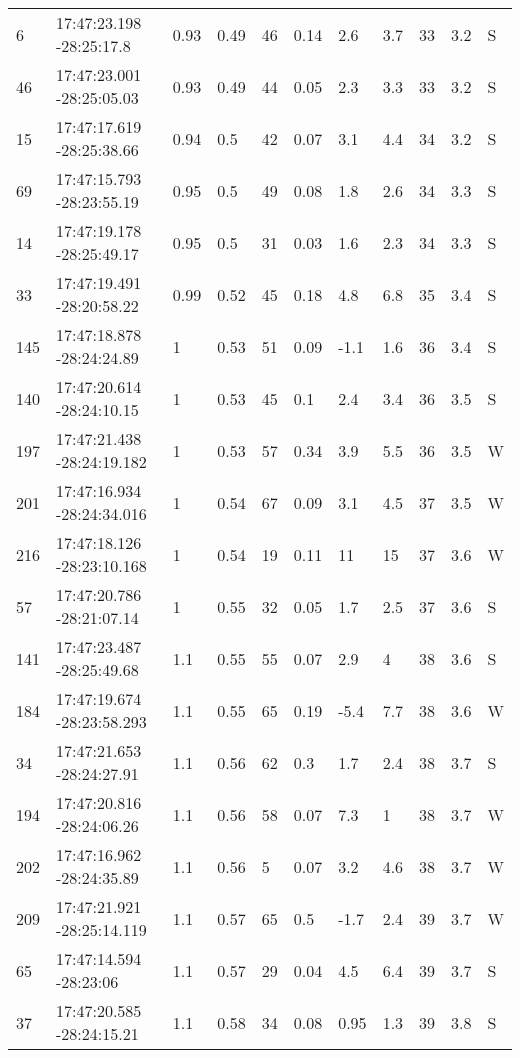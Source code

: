 \begin{deluxetable}[htp]
\begin{tabular}{lllllllllll}
6 & 17:47:23.198 -28:25:17.8 & 0.93 & 0.49 & 46 & 0.14 & 2.6 & 3.7 & 33 & 3.2\ee{24} & S \\
46 & 17:47:23.001 -28:25:05.03 & 0.93 & 0.49 & 44 & 0.05 & 2.3 & 3.3 & 33 & 3.2\ee{24} & S \\
15 & 17:47:17.619 -28:25:38.66 & 0.94 & 0.5 & 42 & 0.07 & 3.1 & 4.4 & 34 & 3.2\ee{24} & S \\
69 & 17:47:15.793 -28:23:55.19 & 0.95 & 0.5 & 49 & 0.08 & 1.8 & 2.6 & 34 & 3.3\ee{24} & S \\
14 & 17:47:19.178 -28:25:49.17 & 0.95 & 0.5 & 31 & 0.03 & 1.6 & 2.3 & 34 & 3.3\ee{24} & S \\
33 & 17:47:19.491 -28:20:58.22 & 0.99 & 0.52 & 45 & 0.18 & 4.8 & 6.8 & 35 & 3.4\ee{24} & S \\
145 & 17:47:18.878 -28:24:24.89 & 1 & 0.53 & 51 & 0.09 & -1.1 & 1.6 & 36 & 3.4\ee{24} & S \\
140 & 17:47:20.614 -28:24:10.15 & 1 & 0.53 & 45 & 0.1 & 2.4 & 3.4 & 36 & 3.5\ee{24} & S \\
197 & 17:47:21.438 -28:24:19.182 & 1 & 0.53 & 57 & 0.34 & 3.9 & 5.5 & 36 & 3.5\ee{24} & W \\
201 & 17:47:16.934 -28:24:34.016 & 1 & 0.54 & 67 & 0.09 & 3.1 & 4.5 & 37 & 3.5\ee{24} & W \\
216 & 17:47:18.126 -28:23:10.168 & 1 & 0.54 & 19 & 0.11 & 11 & 15 & 37 & 3.6\ee{24} & W \\
57 & 17:47:20.786 -28:21:07.14 & 1 & 0.55 & 32 & 0.05 & 1.7 & 2.5 & 37 & 3.6\ee{24} & S \\
141 & 17:47:23.487 -28:25:49.68 & 1.1 & 0.55 & 55 & 0.07 & 2.9 & 4 & 38 & 3.6\ee{24} & S \\
184 & 17:47:19.674 -28:23:58.293 & 1.1 & 0.55 & 65 & 0.19 & -5.4 & 7.7 & 38 & 3.6\ee{24} & W \\
34 & 17:47:21.653 -28:24:27.91 & 1.1 & 0.56 & 62 & 0.3 & 1.7 & 2.4 & 38 & 3.7\ee{24} & S \\
194 & 17:47:20.816 -28:24:06.26 & 1.1 & 0.56 & 58 & 0.07 & 7.3 & 1 & 38 & 3.7\ee{24} & W \\
202 & 17:47:16.962 -28:24:35.89 & 1.1 & 0.56 & 5 & 0.07 & 3.2 & 4.6 & 38 & 3.7\ee{24} & W \\
209 & 17:47:21.921 -28:25:14.119 & 1.1 & 0.57 & 65 & 0.5 & -1.7 & 2.4 & 39 & 3.7\ee{24} & W \\
65 & 17:47:14.594 -28:23:06 & 1.1 & 0.57 & 29 & 0.04 & 4.5 & 6.4 & 39 & 3.7\ee{24} & S \\
37 & 17:47:20.585 -28:24:15.21 & 1.1 & 0.58 & 34 & 0.08 & 0.95 & 1.3 & 39 & 3.8\ee{24} & S \\

\end{tabular}
\end{deluxetable}
